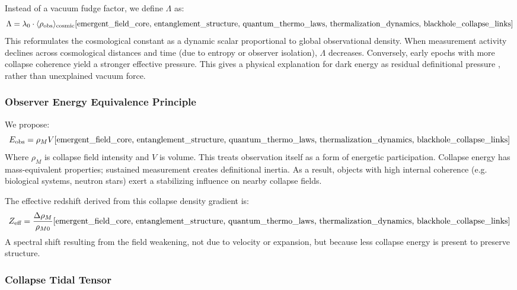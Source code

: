 Instead of a vacuum fudge factor, we define \( \Lambda \) as:
\[
\Lambda = \lambda_0 \cdot \langle \rho_{\text{obs}} \rangle_{\text{cosmic}} \cite{emergent_field_core, entanglement_structure, quantum_thermo_laws, thermalization_dynamics, blackhole_collapse_links}
\]
This reformulates the cosmological constant as a dynamic scalar proportional to global observational density. 
When measurement activity declines across cosmological distances and time (due to entropy or observer isolation), \( \Lambda \) decreases. 
Conversely, early epochs with more collapse coherence yield a stronger effective pressure. This gives a physical explanation for dark energy as  residual definitional pressure , rather than unexplained vacuum force.

\subsubsection{Observer Energy Equivalence Principle} \cite{emergent_field_core, entanglement_structure, quantum_thermo_laws, thermalization_dynamics, blackhole_collapse_links}

We propose:
\[
E_{\text{obs}} = \rho_M V \cite{emergent_field_core, entanglement_structure, quantum_thermo_laws, thermalization_dynamics, blackhole_collapse_links}
\]
Where \( \rho_M \) is collapse field intensity and \( V \) is volume. This treats observation itself as a form of energetic participation. 
Collapse energy has mass-equivalent properties; sustained measurement creates definitional inertia. As a result, objects with high internal coherence (e.g. biological systems, neutron stars) exert a stabilizing influence on nearby collapse fields. 

The effective redshift derived from this collapse density gradient is:
\[
Z_{\text{eff}} = \frac{\Delta \rho_M}{\rho_{M0}} \cite{emergent_field_core, entanglement_structure, quantum_thermo_laws, thermalization_dynamics, blackhole_collapse_links}
\]
A spectral shift resulting from the field weakening, not due to velocity or expansion, but because less collapse energy is present to preserve structure.

\subsubsection{Collapse Tidal Tensor} \cite{emergent_field_core, entanglement_structure, quantum_thermo_laws, thermalization_dynamics, blackhole_collapse_links}

